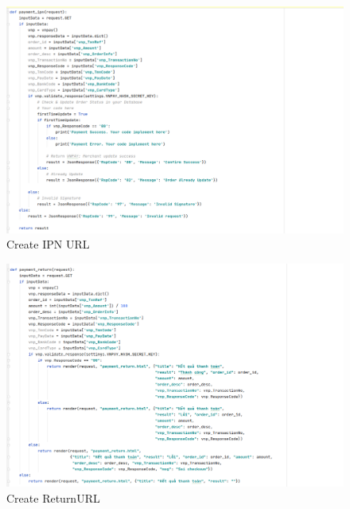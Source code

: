 \documentclass[12pt,a4paper]{article}
\begin{document}
\begin{figure}[p]
  	\includegraphics[width=\linewidth]{payment-ipn.png}
    \caption{Create IPN URL}
  	\label{fig:iurl}
\end{figure}

\begin{figure}[h]
  	\includegraphics[width=\linewidth]{payment-re.png}
    \caption{Create ReturnURL}
  	\label{fig:rurl}
\end{figure}
\end{document}
